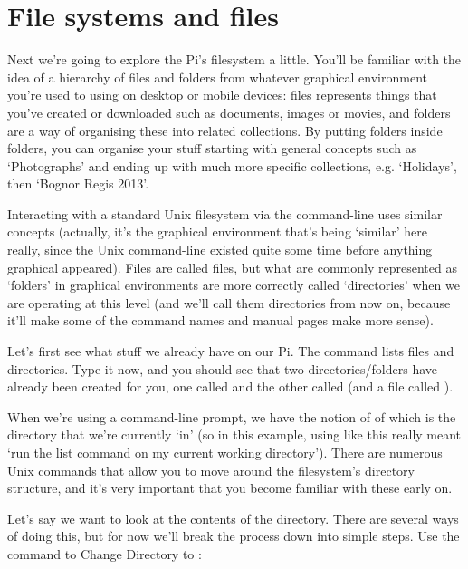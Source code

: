 \section{File systems and files}

Next we're going to explore the Pi's filesystem a little. You'll be familiar with the idea of a hierarchy of files and folders from whatever graphical environment you're used to using on desktop or mobile devices: files represents things that you've created or downloaded such as documents, images or movies, and folders are a way of organising these into related collections. By putting folders inside folders, you can organise your stuff starting with general concepts such as `Photographs' and ending up with much more specific collections, e.g. `Holidays', then `Bognor Regis 2013'.

Interacting with a standard Unix filesystem via the command-line uses similar concepts (actually, it's the graphical environment that's being `similar' here really, since the Unix command-line existed quite some time before anything graphical appeared). Files are called files, but what are commonly represented as `folders' in graphical environments are more correctly called `directories' when we are operating at this level (and we'll call them directories from now on, because it'll make some of the command names and manual pages make more sense).

Let's first see what stuff we already have on our Pi. The  command lists files and directories. Type it now, and you should see that two directories/folders have already been created for you, one called  and the other called  (and a file called ).



When we're using a command-line prompt, we have the notion of of  which is the directory that we're currently `in' (so in this example, using  like this really meant `run the list command on my current working directory'). There are numerous Unix commands that allow you to move around the filesystem's directory structure, and it's very important that you become familiar with these early on.

Let's say we want to look at the contents of the  directory. There are several ways of doing this, but for now we'll break the process down into simple steps. Use the  command to Change Directory to :

